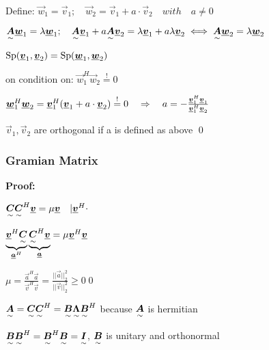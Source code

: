 Define: $\vec{w}_1=\vec{v}_1; \quad \vec{w}_2=\vec{v}_1 + a\cdot\vec{v}_2 \quad with \quad a\neq 0$

$\ma{A}\vec{w}_1=\lambda\vec{w}_1;\quad \ma{A}\vec{v}_1+a\ma{A}\vec{v}_2=\lambda\vec{v}_1+a\lambda\vec{v}_2 \iff \ma{A}\vec{w}_2=\lambda\vec{w}_2$

$\Sp(\vec{v}_1,\vec{v}_2)=\Sp(\vec{w}_1,\vec{w}_2)$

on condition on: $\vec{w}_1^H\vec{w}_2\overset{!}{=}0$

$\vec{w}_1^H\vec{w}_2=\vec{v}_1^H(\vec{v}_1+a\cdot\vec{v}_2)\overset{!}{=}0 \pfeil  a=-\frac{\vec{v}_1^H\vec{v}_1}{\vec{v}_1^H\vec{v}_2}$

$\vec{v}_1, \vec{v}_2$ are orthogonal if a is defined as above
\qed


\subsubsection{Gramian Matrix}\label{sec:Gramian_matrix}

\textbf{Proof:} 

$\ma{C}\ma{C}^H\vec{v}=\mu\vec{v} \quad | \vec{v}^H\cdot$

$\underbrace{\vec{v}^H\ma{C}}_{\vec{a}^H}\underbrace{\ma{C}^H\vec{v}}_{\vec{a}}=\mu\vec{v}^H\vec{v}$
 
$\mu=\frac{\vec{a}^H\vec{a}}{\vec{v}^H\vec{v}}=\frac{||\vec{a}||_2^2}{||\vec{v}||_2^2 }\geq 0$\qed


$\ma{A}=\ma{C}\ma{C}^H=\ma{B}\ma{\Lambda}\ma{B}^H$ because $\ma{A}$ is hermitian

$\ma{B}\ma{B}^H=\ma{B}^H\ma{B}=\ma{I}$, \quad $\ma{B}$ is unitary and orthonormal





